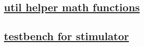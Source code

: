 \documentclass{article}
\begin{document}
  


  \subsection{\href{../files/util_helper_math-vh.html}{util helper math functions}}
  \subsection{\href{../files2/tb_helper-v.html}{testbench for stimulator}}
\end{document}
